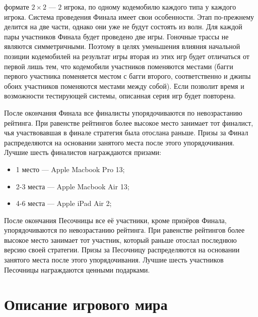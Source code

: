 \begin{itemize}
        формате $2\times2$ --- $2$ игрока, по одному кодемобилю каждого типа у каждого игрока. Система проведения Финала имеет свои
        особенности. Этап по-прежнему делится на две части, однако они уже не будут состоять из волн. Для каждой пары участников Финала
        будет проведено две игры. Гоночные трассы не являются симметричными. Поэтому в целях уменьшения влияния начальной позиции
        кодемобилей на результат игры вторая из этих игр будет отличаться от первой лишь тем, что кодемобили участников поменяются местами
        (багги первого участника поменяется местом с багги второго, соответственно и джипы обоих участников поменяются местами между собой).
        Если позволит время и возможности тестирующей системы, описанная серия игр будет повторена.
\end{itemize}

После окончания Финала все финалисты упорядочиваются по невозрастанию рейтинга. При равенстве рейтингов более высокое место занимает тот
финалист, чья участвовавшая в финале стратегия была отослана раньше. Призы за Финал распределяются на основании занятого места после этого
упорядочивания. Лучшие шесть финалистов награждаются призами:
\begin{itemize}
\item 1 место --- Apple Macbook Pro 13\textquotedbl;
\item 2-3 места --- Apple Macbook Air 13\textquotedbl;
\item 4-6 места --- Apple iPad Air 2;
\end{itemize}

После окончания Песочницы все её участники, кроме призёров Финала, упорядочиваются по невозрастанию рейтинга. При равенстве рейтингов более
высокое место занимает тот участник, который раньше отослал последнюю версию своей стратегии. Призы за Песочницу распределяются на основании
занятого места после этого упорядочивания. Лучшие шесть участников Песочницы награждаются ценными подарками.

\section{Описание игрового мира}

